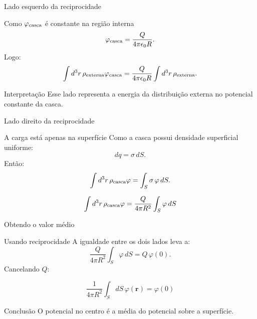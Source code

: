 \documentclass[aspectratio=169,11pt]{beamer}
\begin{document}
\begin{frame}{Lado esquerdo da reciprocidade}

\begin{mybox}{Como \(\varphi_{\rm casca}\) é constante na região interna}
\[
\varphi_{\rm casca}
=
\frac{Q}{4\pi\epsilon_0 R}.
\]
Logo:
\[
\int d^3r\,\rho_{\rm externa}\varphi_{\rm casca}
=
\frac{Q}{4\pi\epsilon_0 R}
\int d^3r\,\rho_{\rm externa}.
\]
\end{mybox}

\begin{alertblock}{Interpretação}
Esse lado representa a energia da distribuição externa no potencial constante da casca.
\end{alertblock}

\end{frame}

\begin{frame}{Lado direito da reciprocidade}

\begin{mybox}{A carga está apenas na superfície}
Como a casca possui densidade superficial uniforme:
\[
dq = \sigma\,dS.
\]
Então:
\[
\int d^3r\,\rho_{\rm casca}\varphi
=
\int_S \sigma\,\varphi\,dS.
\]
\end{mybox}

\begin{eqbox}
\begin{equation}
\int d^3r\,\rho_{\rm casca}\varphi
=
\frac{Q}{4\pi R^2}\int_S \varphi\,dS
\end{equation}
\end{eqbox}

\end{frame}

\begin{frame}{Obtendo o valor médio}

\begin{mybox}{Usando reciprocidade}
A igualdade entre os dois lados leva a:
\[
\frac{Q}{4\pi R^2}\int_S \varphi\,dS
=
Q\,\varphi(0).
\]
Cancelando \(Q\):
\end{mybox}

\begin{eqbox}
\begin{equation}
\frac{1}{4\pi R^2}\int_S dS\,\varphi(\mathbf r)
=
\varphi(0)
\end{equation}
\end{eqbox}

\begin{alertblock}{Conclusão}
O potencial no centro é a média do potencial sobre a superfície.
\end{alertblock}

\end{frame}
\end{document}
